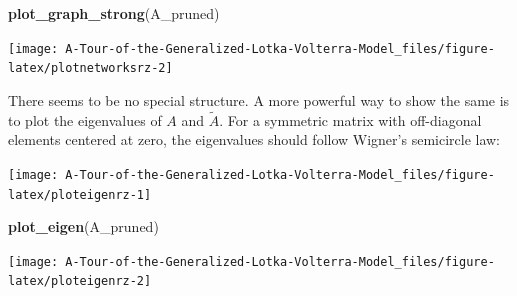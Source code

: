 \documentclass[
]{book}
\newenvironment{Shaded}{\begin{snugshade}}{\end{snugshade}}
\newcommand{\ControlFlowTok}[1]{\textcolor[rgb]{0.13,0.29,0.53}{\textbf{#1}}}
\newcommand{\DataTypeTok}[1]{\textcolor[rgb]{0.13,0.29,0.53}{#1}}
\newcommand{\DecValTok}[1]{\textcolor[rgb]{0.00,0.00,0.81}{#1}}
\newcommand{\KeywordTok}[1]{\textcolor[rgb]{0.13,0.29,0.53}{\textbf{#1}}}
\newcommand{\NormalTok}[1]{#1}
\newcommand{\OperatorTok}[1]{\textcolor[rgb]{0.81,0.36,0.00}{\textbf{#1}}}
\newcommand{\OtherTok}[1]{\textcolor[rgb]{0.56,0.35,0.01}{#1}}
\newcommand{\StringTok}[1]{\textcolor[rgb]{0.31,0.60,0.02}{#1}}
\begin{document}
\begin{Shaded}
\begin{Highlighting}[]
\KeywordTok{plot_graph_strong}\NormalTok{(A_pruned)}
\end{Highlighting}
\end{Shaded}

\begin{center}\texttt{[image: A-Tour-of-the-Generalized-Lotka-Volterra-Model\_files/figure-latex/plotnetworksrz-2]} \end{center}

There seems to be no special structure. A more powerful way to show the same is to plot the eigenvalues of \(A\) and \(\tilde{A}\). For a symmetric matrix with off-diagonal elements centered at zero, the eigenvalues should follow Wigner's semicircle law:

\begin{Shaded}
\end{Shaded}

\begin{center}\texttt{[image: A-Tour-of-the-Generalized-Lotka-Volterra-Model\_files/figure-latex/ploteigenrz-1]} \end{center}

\begin{Shaded}
\begin{Highlighting}[]
\KeywordTok{plot_eigen}\NormalTok{(A_pruned)}
\end{Highlighting}
\end{Shaded}

\begin{center}\texttt{[image: A-Tour-of-the-Generalized-Lotka-Volterra-Model\_files/figure-latex/ploteigenrz-2]} \end{center}
\end{document}
